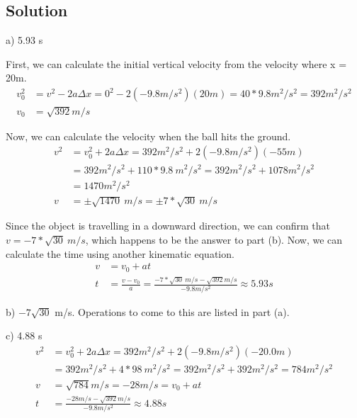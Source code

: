 \documentclass[12pt]{article}
\begin{document}
\subsection*{Solution}
a) 5.93 \unit{s}

First, we can calculate the initial vertical velocity from the velocity where x = 20m.
\begin{align*}
    v_0^2 &= v^2 - 2a\Delta x = 0^2 - 2(-9.8\unit{m/s^2})(20\unit{m}) = 40*9.8 \unit{m^2/s^2} = 392 \unit{m^2/s^2}\\
    v_0 &= \sqrt{392} \unit{m/s}
\end{align*}

Now, we can calculate the velocity when the ball hits the ground.
\begin{align*}
    v^2 &= v_0^2 + 2a\Delta x = 392 \unit{m^2/s^2} + 2(-9.8\unit{m/s^2})(-55\unit{m})\\
        &= 392 \unit{m^2/s^2} + 110 * 9.8\ \unit{m^2/s^2} = 392 \unit{m^2/s^2} + 1078 \unit{m^2/s^2}\\
        &= 1470 \unit{m^2/s^2}\\
    v &= \pm\sqrt{1470}\ \unit{m/s} = \pm7*\sqrt{30}\ \unit{m/s}
\end{align*}

Since the object is travelling in a downward direction, we can confirm that $v = -7*\sqrt{30}\ \unit{m/s}$, which happens to be the answer to part (b). Now, we can calculate the time using another kinematic equation.
\begin{align*}
    v &= v_0 + at\\
    t &= \frac{v - v_0}{a} = \frac{-7*\sqrt{30}\ \unit{m/s} - \sqrt{392} \unit{m/s}}{-9.8 \unit{m/s^2}} \approx \boxed{5.93 \unit{s}}
\end{align*}

b) $-7\sqrt{30}$ \unit{m/s}. Operations to come to this are listed in part (a).

\pagebreak

c) 4.88 \unit{s}
\begin{align*}
    v^2 &= v_0^2 + 2a\Delta x = 392 \unit{m^2/s^2} + 2(-9.8\unit{m/s^2})(-20.0\unit{m}) \\
        &= 392\unit{m^2/s^2} + 4*98\ \unit{m^2/s^2} = 392\unit{m^2/s^2} + 392\unit{m^2/s^2} = 784\unit{m^2/s^2}\\
    v &= \sqrt{784} \unit{m/s} = -28 \unit{m/s} = v_0 + at\\
    t &= \frac{-28 \unit{m/s} - \sqrt{392} \unit{m/s}}{-9.8 \unit{m/s^2}} \approx \boxed{4.88 \unit{s}}
\end{align*}
\end{document}
